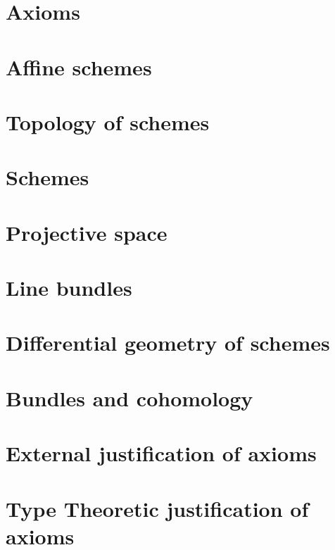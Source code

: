\documentclass{../util/zariski}
\begin{document}
\section{Axioms}


\section{Affine schemes}


\section{Topology of schemes}


\section{Schemes}


\section{Projective space}


\section{Line bundles}


\section{Differential geometry of schemes}


\section{Bundles and cohomology}


\section{External justification of axioms}


\section{Type Theoretic justification of axioms}


\printindex

\printbibliography
\end{document}
